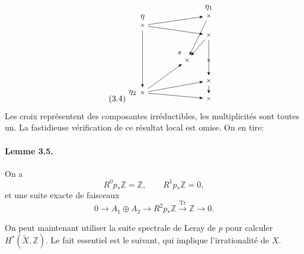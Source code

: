 \documentclass[10pt]{article}
\newcommand{\Z}{\mathbb Z}
\newcommand{\Tr}{\operatorname{Tr}}
\begin{document}
\[
\tag{3.4}
\begin{tikzpicture}[scale=1.02,>=Stealth]
  \tikzset{pt/.style={inner sep=0.5pt,font=\scriptsize}}
  \node[pt,label=above:\(\eta\)] (eta) at (0,1.65) {\(\times\)};
  \node[pt,label=above:\(\eta_1\)] (e11) at (2.75,2.05) {\(\times\)};
  \node[pt] (e12) at (2.75,1.25) {\(\times\)};
  \node[pt,label=left:\(\eta_2\)] (e2) at (0,-1.15) {\(\times\)};
  \node[pt,label=above left:\(s\)] (s0) at (1.85,0.20) {\(\times\)};
  \node[pt] (s1) at (2.75,0.20) {\(\times\)};
  \node[pt] (s2) at (2.75,-0.65) {\(\times\)};
  \node[pt] (s3) at (2.75,-1.40) {\(\times\)};
  \draw[->,shorten >=3pt,shorten <=3pt] (eta)--(e11);
  \draw[->,shorten >=3pt,shorten <=3pt] (eta)--(e12);
  \draw[->,shorten >=3pt,shorten <=3pt] (eta)--(e2);
  \draw[->,shorten >=3pt,shorten <=3pt] (e2)--(s0);
  \draw[->,shorten >=3pt,shorten <=3pt] (e2)--(s2);
  \draw[->,shorten >=3pt,shorten <=3pt] (e2)--(s3);
  \draw[->,shorten >=3pt,shorten <=3pt] (e11)--(s0);
  \draw[->,shorten >=3pt,shorten <=3pt] (e12)--(s0);
  \draw[->,shorten >=3pt,shorten <=3pt] (e12)--(s2);
  \draw[->,shorten >=3pt,shorten <=3pt] (s2)--(s3);
\end{tikzpicture}
\]
Les croix représentent des composantes irréductibles, les multiplicités sont toutes un. La fastidieuse vérification de ce résultat local est omise. On en tire:
\paragraph{Lemme 3.5.} On a
\[
R^0p_*\Z=\Z,
\qquad R^1p_*\Z=0,
\]
et une suite exacte de faisceaux
\[
0\longrightarrow A_1\oplus A_2\longrightarrow R^2p_*\Z\xrightarrow{\Tr}\Z\longrightarrow0.
\]

On peut maintenant utiliser la suite spectrale de Leray de \(p\) pour calculer \(H^*(\widetilde X,\Z)\). Le fait essentiel est le suivant, qui implique l'irrationalité de \(X\).
\end{document}
